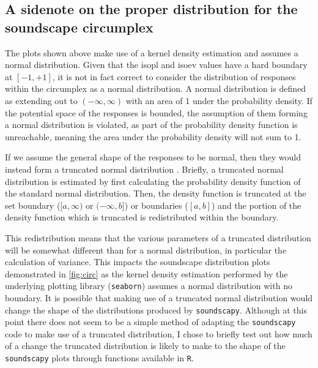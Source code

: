 \subsection{A sidenote on the proper distribution for the soundscape circumplex}

The plots shown above make use of a kernel density estimation \citep{Silverman2018} and assumes a normal distribution. Given that the \gls{isopl} and \gls{isoev} values have a hard boundary at $[-1, +1]$, it is not in fact correct to consider the distribution of responses within the circumplex as a normal distribution. A normal distribution is defined as extending out to $(-\infty, \infty)$ with an area of 1 under the probability density. If the potential space of the responses is bounded, the assumption of them forming a normal distribution is violated, as part of the probability density function is unreachable, meaning the area under the probability density will not sum to 1.

If we assume the general shape of the responses to be normal, then they would instead form a truncated normal distribution \citep{Burkardt2014truncated,Barr1999Mean}. Briefly, a truncated normal distribution is estimated by first calculating the probability density function of the standard normal distribution. Then, the density function is truncated at the set boundary ($[a, \infty)$ or $(-\infty, b]$) or boundaries ($[a, b]$) and the portion of the density function which is truncated is redistributed within the boundary.

This redistribution means that the various parameters of a truncated distribution will be somewhat different than for a normal distribution, in particular the calculation of variance. This impacts the soundscape distribution plots demonstrated in \cref{fig:circ} as the kernel density estimation performed by the underlying plotting library (\texttt{seaborn}) assumes a normal distribution with no boundary. It is possible that making use of a truncated normal distribution would change the shape of the distributions produced by \texttt{soundscapy}. Although at this point there does not seem to be a simple method of adapting the \texttt{soundscapy} code to make use of a truncated distribution, I chose to briefly test out how much of a change the truncated distribution is likely to make to the shape of the \texttt{soundscapy} plots through functions available in \texttt{R}.

